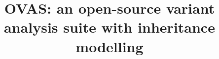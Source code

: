 \documentclass[twocolumn]{bmcart}%
\def\app{OVAS}
\begin{document}
\begin{frontmatter}

\begin{fmbox}


\title{\app{}: an open-source variant analysis suite with inheritance modelling}


\author[
   addressref={aff1},                   %
   email={},   							%
   noteref={n1}
]{\inits{} }
\author[
   addressref={aff1},
   email={m.tekman@ucl.ac.uk},
   noteref={n1}
]{\inits{} }
\author[
   addressref={aff2},
   email={}
]{ }
\author[
   addressref={aff1},
   email={}
]{\inits{} }
\author[
   addressref={aff1},
      corref={aff1},
   email={r.kleta@ucl.ac.uk}
]{\inits{} }
\author[
   addressref={aff1},
   email={h.stanescu@ucl.ac.uk}
]{\inits{} }

 
\address[id=aff1]{%
  , %
}
\address[id=aff2]{%
  ,
  ,
}


\end{fmbox}
\end{frontmatter}
\end{document}
